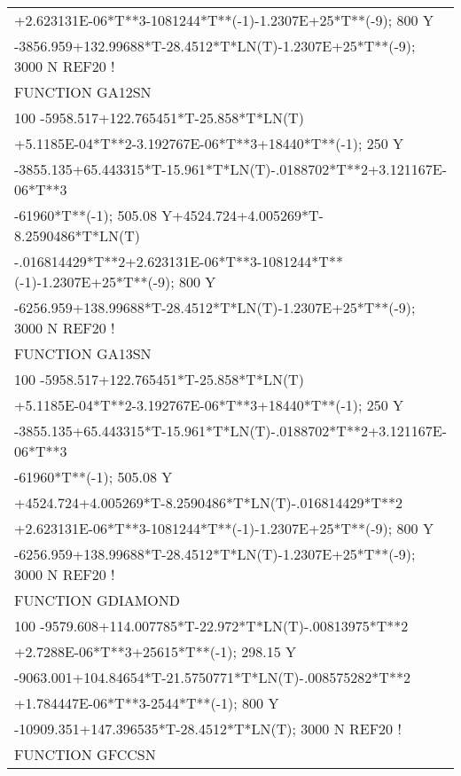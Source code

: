 \begin{longtable}[H]{ l l l }
	\multicolumn{3}{l}{+2.623131E-06*T**3-1081244*T**(-1)-1.2307E+25*T**(-9); 800 Y}\\
	\multicolumn{3}{l}{-3856.959+132.99688*T-28.4512*T*LN(T)-1.2307E+25*T**(-9); 3000 N REF20 !}\\
	FUNCTION GA12SN & & \\
	\multicolumn{3}{l}{100 -5958.517+122.765451*T-25.858*T*LN(T)}\\
	\multicolumn{3}{l}{+5.1185E-04*T**2-3.192767E-06*T**3+18440*T**(-1); 250 Y}\\
	\multicolumn{3}{l}{-3855.135+65.443315*T-15.961*T*LN(T)-.0188702*T**2+3.121167E-06*T**3}\\
	\multicolumn{3}{l}{-61960*T**(-1); 505.08 Y+4524.724+4.005269*T-8.2590486*T*LN(T)}\\
	\multicolumn{3}{l}{-.016814429*T**2+2.623131E-06*T**3-1081244*T**(-1)-1.2307E+25*T**(-9); 800 Y}\\
	\multicolumn{3}{l}{-6256.959+138.99688*T-28.4512*T*LN(T)-1.2307E+25*T**(-9); 3000 N REF20 !}\\
	FUNCTION GA13SN & & \\
	\multicolumn{3}{l}{100 -5958.517+122.765451*T-25.858*T*LN(T)}\\
	\multicolumn{3}{l}{+5.1185E-04*T**2-3.192767E-06*T**3+18440*T**(-1); 250 Y}\\
	\multicolumn{3}{l}{-3855.135+65.443315*T-15.961*T*LN(T)-.0188702*T**2+3.121167E-06*T**3}\\
	\multicolumn{3}{l}{-61960*T**(-1); 505.08 Y}\\
	\multicolumn{3}{l}{+4524.724+4.005269*T-8.2590486*T*LN(T)-.016814429*T**2}\\
	\multicolumn{3}{l}{+2.623131E-06*T**3-1081244*T**(-1)-1.2307E+25*T**(-9); 800 Y}\\
	\multicolumn{3}{l}{-6256.959+138.99688*T-28.4512*T*LN(T)-1.2307E+25*T**(-9); 3000 N REF20 !}\\
	FUNCTION GDIAMOND & & \\
	\multicolumn{3}{l}{100 -9579.608+114.007785*T-22.972*T*LN(T)-.00813975*T**2}\\
	\multicolumn{3}{l}{+2.7288E-06*T**3+25615*T**(-1); 298.15 Y}\\
	\multicolumn{3}{l}{-9063.001+104.84654*T-21.5750771*T*LN(T)-.008575282*T**2}\\
	\multicolumn{3}{l}{+1.784447E-06*T**3-2544*T**(-1); 800 Y}\\
	\multicolumn{3}{l}{-10909.351+147.396535*T-28.4512*T*LN(T); 3000 N REF20 !}\\
	FUNCTION GFCCSN & & \\

\end{longtable}
